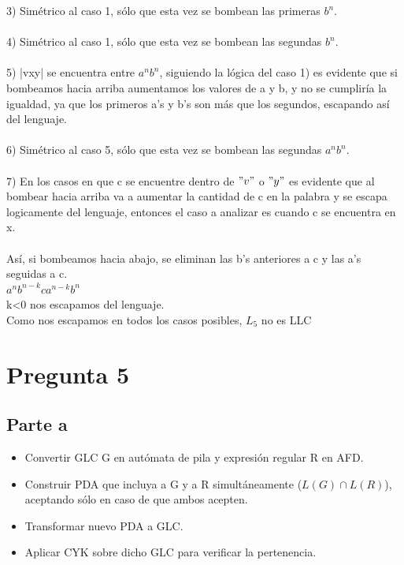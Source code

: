 \documentclass[11pt,letterpaper]{article}
\begin{document}
3) Simétrico al caso 1, sólo que esta vez se bombean las primeras $b^n$. \\
 \\
4) Simétrico al caso 1, sólo que esta vez se bombean las segundas $b^n$. \\
 \\
5) |vxy| se encuentra entre $a^nb^n$, siguiendo la lógica del caso 1) es evidente que si bombeamos hacia arriba aumentamos los valores de a y b, y no se cumpliría la igualdad, ya que los primeros a's y b's son más que los segundos, escapando así del lenguaje. \\
 \\
6) Simétrico al caso 5, sólo que esta vez se bombean las segundas $a^nb^n$. \\
 \\
7) En los casos en que c se encuentre dentro de $"v"$ o $"y"$ es evidente que al bombear hacia arriba va a aumentar la cantidad de c en la palabra y se escapa logicamente del lenguaje, entonces el caso a analizar es cuando c se encuentra en x. \\
 \\
\indent Así, si bombeamos hacia abajo, se eliminan las b's anteriores a c y las a's seguidas a c. \\
\indent $a^nb^{n-k}ca^{n-k}b^n$ \\
\indent k<0 nos escapamos del lenguaje. \\

\noindent Como nos escapamos en todos los casos posibles, $L_{5}$ no es LLC
  
\section{Pregunta 5}
\subsection{Parte a}
	\begin{itemize}
		\item Convertir GLC G en autómata de pila y expresión regular R en AFD.
		\item Construir PDA que incluya a G y a R simultáneamente ($L(G) \cap L(R)$), aceptando sólo en caso de que ambos acepten.
		\item Transformar nuevo PDA a GLC.
		\item Aplicar CYK sobre dicho GLC para verificar la pertenencia.
	\end{itemize}
\end{document}

